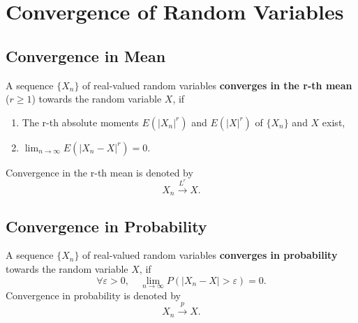 \chapter{Convergence of Random Variables}


\section{Convergence in Mean}

\begin{definition}
    A sequence $\{X_n\}$ of real-valued random variables \textbf{converges in the r-th mean} ($r\geq1$) towards the random variable $X$, if
    \begin{enumerate}
        \item The r-th absolute moments $E(|X_n|^r)$ and $E(|X|^r)$ of $\{X_n\}$ and $X$ exist,
        \item $\lim_{n\to\infty}E\left(|X_n-X|^r\right)=0$.
    \end{enumerate}
    Convergence in the r-th mean is denoted by
    \begin{equation}
        X_n \stackrel{L^r}{\rightarrow} X.
    \end{equation}
\end{definition}

\section{Convergence in Probability}

\begin{definition}
    A sequence $\{X_n\}$ of real-valued random variables \textbf{converges in probability} towards the random variable $X$, if
    \begin{equation}
        \forall\varepsilon>0,\quad\lim_{n\to\infty}P\left(|X_n-X|>\varepsilon\right)=0.
    \end{equation}
    Convergence in probability is denoted by
    \begin{equation}
        X_n \stackrel{p}{\rightarrow} X.
    \end{equation}
\end{definition}

